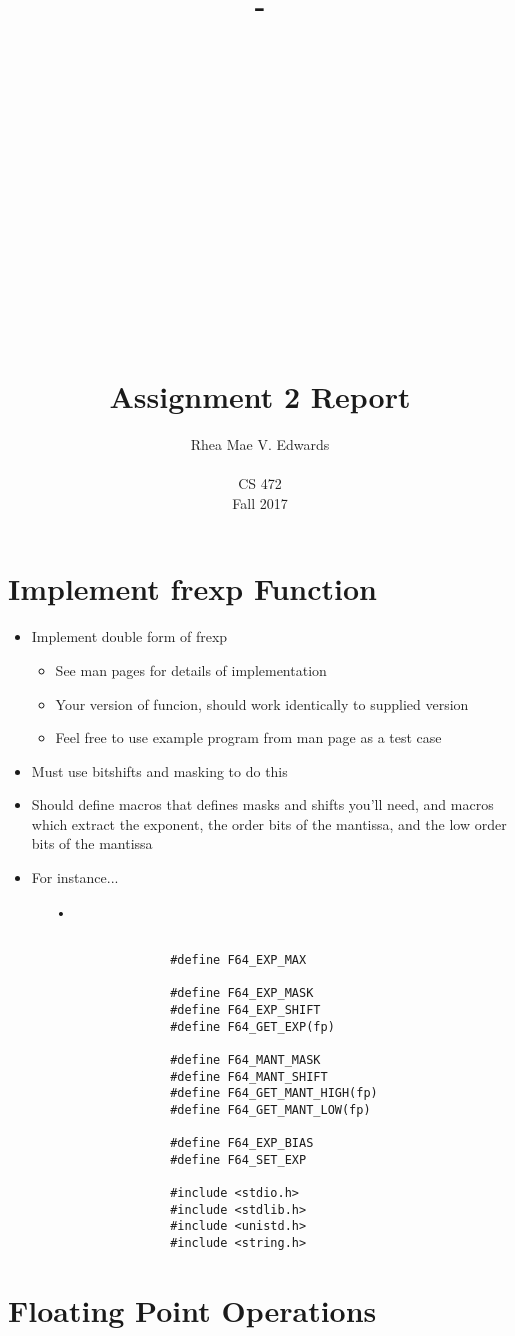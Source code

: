 \documentclass[letterpaper,10pt,onecolumn]{IEEEtran}
\title{-\\ ~ \\ ~ \\ ~ \\ ~ \\ ~ \\ ~ \\ ~ \\ ~ \\ ~ \\ Assignment 2 Report}
\author{Rhea Mae V. Edwards\\ ~ \\CS 472\\Fall 2017}
\begin{document}
\maketitle

\newpage

\section{\textbf{Implement frexp Function}}

\noindent

\begin{itemize}
	\item Implement double form of frexp
		\begin{itemize}
			\item See man pages for details of implementation
			\item Your version of funcion, should work identically to supplied version
			\item Feel free to use example program from man page as a test case
		\end{itemize}
	\item Must use bitshifts and masking to do this
	\item Should define macros that defines masks and shifts you'll need, and macros which extract the exponent, the order bits of the mantissa, and the low order bits of the mantissa
	\item For instance...
		\begin{itemize}
			\item[•] 
				\begin{verbatim}
				
				#define F64_EXP_MAX
				
				#define F64_EXP_MASK 
				#define F64_EXP_SHIFT
				#define F64_GET_EXP(fp)

				#define F64_MANT_MASK
				#define F64_MANT_SHIFT
				#define F64_GET_MANT_HIGH(fp)
				#define F64_GET_MANT_LOW(fp)

				#define F64_EXP_BIAS
				#define F64_SET_EXP 
 
				#include <stdio.h>
				#include <stdlib.h>
				#include <unistd.h>
				#include <string.h>
				\end{verbatim}
		\end{itemize}
\end{itemize}

\section{\textbf{Floating Point Operations}}
\end{document}
